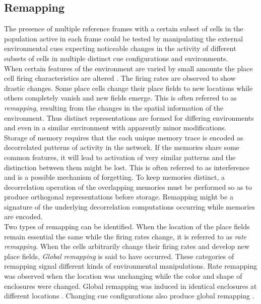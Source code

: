 \subsection{Remapping}
\label{remapping}
The presence of multiple reference frames with a certain subset of cells in the population active in each frame could be tested by manipulating the external environmental cues expecting noticeable changes in the activity of different subsets of cells in multiple distinct cue configurations and environments.\\

When certain features of the environment are varied by small amounts the place cell firing characteristics are altered \cite{Kubie1987}. The firing rates are observed to show drastic changes. Some place cells change their place fields to new locations while others completely vanish and new fields emerge. This is often referred to as \emph{remapping}, resulting from the changes in the spatial information of the environment. Thus distinct representations are formed for differing environments and even in a similar environment with apparently minor modifications. \\
Storage of memory requires that the each unique memory trace is encoded as decorrelated patterns of activity in the network. If the memories share some common features, it will lead to activation of very similar patterns and the distinction between them might be lost. This is often referred to as interference and is a possible mechanism of forgetting. To keep memories distinct, a decorrelation operation of the overlapping memories must be performed so as to produce orthogonal representations before storage. Remapping might be a signature of the underlying decorrelation computations occurring while memories are encoded.\\
Two types of remapping can be identified. When the location of the place fields remain essential the same while the firing rates change, it is referred to as \emph{rate remapping}. When the cells arbitrarily change their firing rates and develop new place fields, \emph{Global remapping} is said to have occurred. These categories of remapping signal different kinds of environmental manipulations. Rate remapping was observed when the location was unchanging while the color and shape of enclosures were changed. Global remapping was induced in identical enclosures at different locations \cite{Leutgeb2005a}. Changing cue configurations also produce global remapping \cite{Leutgeb2005a}.
